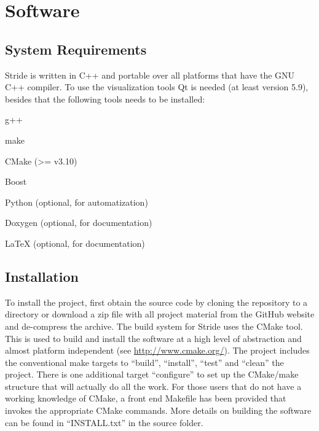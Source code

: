 \chapter{Software}
\label{chap:software}


\section{System Requirements}
\label{section:system}

Stride is written in C++ and portable over all platforms that have the GNU C++ compiler. 
To use the visualization tools Qt is needed (at least version 5.9), besides that the following tools needs to be installed:
\begin{compactitem}
    \item g++
    \item make
    \item CMake (\textgreater = v3.10)
    \item Boost
    \item Python (optional, for automatization)
    \item Doxygen (optional, for documentation)
    \item LaTeX (optional, for documentation)
\end{compactitem}


\section{Installation}
\label{section:Installation}

To install the project, first obtain the source code by cloning the repository to a directory or download a zip file with all project
material from the GitHub website and de-compress the archive. 
The build system for Stride uses the CMake tool. This is used to build and install the software at a high level of abstraction and almost platform independent (see \url{http://www.cmake.org/}). 
The project includes the conventional make targets to ``build'', ``install'', ``test'' and ``clean'' the project. There is one additional target ``configure'' to set up the CMake/make structure that will actually do all the work.
For those users that do not have a working knowledge of CMake, a front end Makefile has been provided that invokes the appropriate CMake commands.
More details on building the software can be found in ``INSTALL.txt'' in the source folder.


